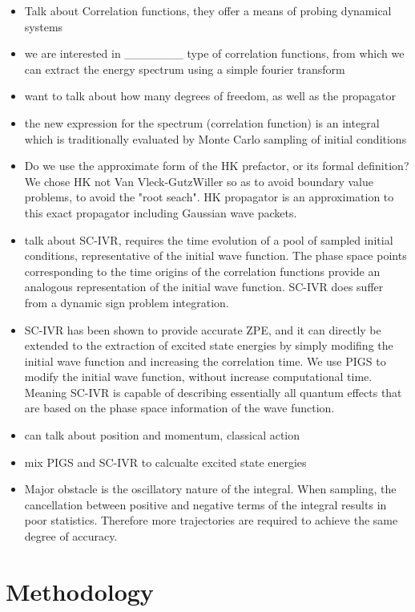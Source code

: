 \documentclass[12pt,letterpaper, oneside, draft]{article}              %
\numberwithin{equation}{section} %
\begin{document}
\begin{itemize}
	\item Talk about Correlation functions, they offer a means of probing dynamical systems
	\item we are interested in \_\_\_\_\_\_\_ type of correlation functions, from which we can extract the energy spectrum using a simple fourier transform
	\item want to talk about how many degrees of freedom, as well as the propagator
	\item the new expression for the spectrum (correlation function) is an integral which is traditionally evaluated by Monte Carlo sampling of initial conditions
	\item Do we use the approximate form of the HK prefactor, or its formal definition? We chose HK not Van Vleck-GutzWiller so as to avoid boundary value problems, to avoid the "root seach". HK propagator is an approximation to this exact propagator including Gaussian wave packets.
	\item talk about SC-IVR, requires the time evolution of a pool of sampled initial conditions, representative of the initial wave function. The phase space points corresponding to the time origins of the correlation functions provide an analogous representation of the initial wave function. SC-IVR does suffer from a dynamic sign problem integration.
	\item SC-IVR has been shown to provide accurate ZPE, and it can directly be extended to the extraction of excited state energies by simply modifing the initial wave function and increasing the correlation time. We use PIGS to modify the initial wave function, without increase computational time. Meaning SC-IVR is capable of describing essentially all quantum effects that are based on the phase space information of the wave function.
	\item can talk about position and momentum, classical action
	\item mix PIGS and SC-IVR to calcualte excited state energies
	\item Major obstacle is the oscillatory nature of the integral. When sampling, the cancellation between positive and negative terms of the integral results in poor statistics. Therefore more trajectories are required to achieve the same degree of accuracy.
\end{itemize}

\section{Methodology}
\end{document}
